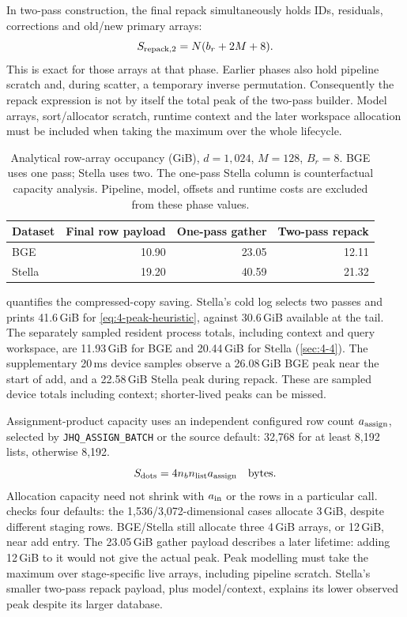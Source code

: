 In two-pass construction, the final repack simultaneously holds IDs,
residuals, corrections and old/new primary arrays:
\begin{equation}
 S_{\rm repack,2}=N(b_r+2M+8).
 \label{eq:4-two-pass-repack}
\end{equation}
This is exact for those arrays at that phase. Earlier phases also hold
pipeline scratch and, during scatter, a temporary inverse permutation.
Consequently the repack expression is not by itself the total peak of
the two-pass builder. Model arrays, sort/allocator scratch, runtime
context and the later workspace allocation must be included when taking
the maximum over the whole lifecycle.

\begin{table}[tbp]
\centering
\caption[Analytical row-array occupancy by construction phase]{Analytical row-array occupancy (GiB), $d=1{,}024$, $M=128$,
$B_r=8$. BGE uses one pass; Stella uses two. The one-pass Stella column
is counterfactual capacity analysis. Pipeline, model, offsets and runtime
costs are excluded from these phase values.}
\label{tab:4-phase-storage}
\small
\begin{tabular}{@{}lrrr@{}}
\toprule
Dataset & Final row payload & One-pass gather & Two-pass repack \\
\midrule
BGE & 10.90 & 23.05 & 12.11 \\
Stella & 19.20 & 40.59 & 21.32 \\
\bottomrule
\end{tabular}
\end{table}

 quantifies the compressed-copy saving. Stella's
cold log selects two passes and prints 41.6\,GiB for
\cref{eq:4-peak-heuristic}, against 30.6\,GiB available at the tail.
The separately sampled resident process totals, including context and
query workspace, are 11.93\,GiB for BGE and 20.44\,GiB for Stella
(\cref{sec:4-4}). The supplementary 20\,ms device samples observe a 26.08\,GiB BGE peak
near the start of add, and a 22.58\,GiB Stella peak during repack.
These are sampled device totals including context; shorter-lived peaks
can be missed.

Assignment-product capacity uses an independent configured row count
$a_{\rm assign}$, selected by \texttt{JHQ\_ASSIGN\_BATCH} or the source
default: 32,768 for at least 8,192 lists, otherwise 8,192.
\begin{equation}
 S_{\rm dots}=4n_b n_{\rm list}a_{\rm assign}\quad\text{bytes}.
 \label{eq:4-assignment-scratch}
\end{equation}
Allocation capacity need not shrink with $a_{\rm in}$ or the rows in a
particular call.  checks four defaults: the 1,536/3,072-dimensional
cases allocate 3\,GiB, despite different staging rows. BGE/Stella still
allocate three 4\,GiB arrays, or 12\,GiB, near add entry. The 23.05\,GiB gather
payload describes a later lifetime: adding 12\,GiB to it would not give
the actual peak. Peak modelling must take the maximum over stage-specific
live arrays, including pipeline scratch. Stella's smaller two-pass
repack payload, plus model/context, explains its lower observed peak
despite its larger database.

